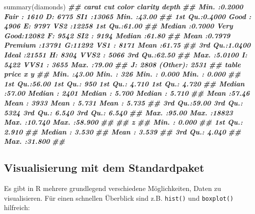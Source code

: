 \documentclass[
  ngerman,
]{article}
\newenvironment{Shaded}{\begin{snugshade}}{\end{snugshade}}
\newcommand{\DocumentationTok}[1]{\textcolor[rgb]{0.56,0.35,0.01}{\textbf{\textit{#1}}}}
\newcommand{\FunctionTok}[1]{\textcolor[rgb]{0.00,0.00,0.00}{#1}}
\newcommand{\NormalTok}[1]{#1}
\begin{document}
\begin{Shaded}
\begin{Highlighting}[]
\FunctionTok{summary}\NormalTok{(diamonds)}
\DocumentationTok{\#\#      carat               cut        color        clarity          depth      }
\DocumentationTok{\#\#  Min.   :0.2000   Fair     : 1610   D: 6775   SI1    :13065   Min.   :43.00  }
\DocumentationTok{\#\#  1st Qu.:0.4000   Good     : 4906   E: 9797   VS2    :12258   1st Qu.:61.00  }
\DocumentationTok{\#\#  Median :0.7000   Very Good:12082   F: 9542   SI2    : 9194   Median :61.80  }
\DocumentationTok{\#\#  Mean   :0.7979   Premium  :13791   G:11292   VS1    : 8171   Mean   :61.75  }
\DocumentationTok{\#\#  3rd Qu.:1.0400   Ideal    :21551   H: 8304   VVS2   : 5066   3rd Qu.:62.50  }
\DocumentationTok{\#\#  Max.   :5.0100                     I: 5422   VVS1   : 3655   Max.   :79.00  }
\DocumentationTok{\#\#                                     J: 2808   (Other): 2531                  }
\DocumentationTok{\#\#      table           price             x                y         }
\DocumentationTok{\#\#  Min.   :43.00   Min.   :  326   Min.   : 0.000   Min.   : 0.000  }
\DocumentationTok{\#\#  1st Qu.:56.00   1st Qu.:  950   1st Qu.: 4.710   1st Qu.: 4.720  }
\DocumentationTok{\#\#  Median :57.00   Median : 2401   Median : 5.700   Median : 5.710  }
\DocumentationTok{\#\#  Mean   :57.46   Mean   : 3933   Mean   : 5.731   Mean   : 5.735  }
\DocumentationTok{\#\#  3rd Qu.:59.00   3rd Qu.: 5324   3rd Qu.: 6.540   3rd Qu.: 6.540  }
\DocumentationTok{\#\#  Max.   :95.00   Max.   :18823   Max.   :10.740   Max.   :58.900  }
\DocumentationTok{\#\#                                                                   }
\DocumentationTok{\#\#        z         }
\DocumentationTok{\#\#  Min.   : 0.000  }
\DocumentationTok{\#\#  1st Qu.: 2.910  }
\DocumentationTok{\#\#  Median : 3.530  }
\DocumentationTok{\#\#  Mean   : 3.539  }
\DocumentationTok{\#\#  3rd Qu.: 4.040  }
\DocumentationTok{\#\#  Max.   :31.800  }
\DocumentationTok{\#\# }
\end{Highlighting}
\end{Shaded}

\hypertarget{visualisierung-mit-dem-standardpaket}{%
\subsection{Visualisierung mit dem Standardpaket}\label{visualisierung-mit-dem-standardpaket}}

Es gibt in R mehrere grundlegend verschiedene Möglichkeiten, Daten zu visualisieren. Für einen schnellen Überblick sind z.B. \texttt{hist()} und \texttt{boxplot()} hilfreich:
\end{document}
